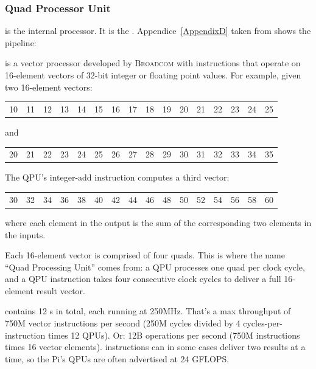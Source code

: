 \subsubsection{Quad Processor Unit}

\qpu{} is the \vc{} internal processor. It is the . Appendice~\ref{AppendixD} taken from \parencite{refVC} shows the pipeline:


\qpu{} is a vector processor developed by \textsc{Broadcom} with instructions that operate on 16-element vectors of 32-bit integer or floating point values. For example, given two 16-element vectors:

\begin{tabular}{cccc|cccc|cccc|cccc}
	10&11&12&13&14&15&16&17&18&19&20&21&22&23&24&25
\end{tabular}

and

\begin{tabular}{cccc|cccc|cccc|cccc}
	20&21&22&23&24&25&26&27&28&29&30&31&32&33&34&35
\end{tabular}

The QPU's integer-add instruction computes a third vector:

\begin{tabular}{cccc|cccc|cccc|cccc}
	30&32&34&36&38&40&42&44&46&48&50&52&54&56&58&60
\end{tabular}

where each element in the output is the sum of the corresponding two elements in the inputs.

Each 16-element vector is comprised of four quads. This is where the name ``Quad Processing Unit'' comes from: a QPU processes one quad per clock cycle, and a QPU instruction takes four consecutive clock cycles to deliver a full 16-element result vector.

\rasp{} contains 12 \qpu{}s in total, each running at 250MHz. That's a max throughput of 750M vector instructions per second (250M cycles divided by 4 cycles-per-instruction times 12 QPUs). Or: 12B operations per second (750M instructions times 16 vector elements). \qpu{} instructions can in some cases deliver two results at a time, so the Pi's QPUs are often advertised at 24 GFLOPS.



